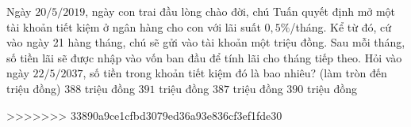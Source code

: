 \begin{ex}%
	Ngày $20/5/2019$, ngày con trai đầu lòng chào đời, chú Tuấn quyết định mở một tài khoản tiết kiệm ở ngân hàng cho con với lãi suất $0,5\%$/tháng. Kể từ đó, cứ vào ngày 21 hàng tháng, chú sẽ gửi vào tài khoản một triệu đồng. Sau mỗi tháng, số tiền lãi sẽ được nhập vào vốn ban đầu để tính lãi cho tháng tiếp theo. Hỏi vào ngày $22/5/2037$, số tiền trong khoản tiết kiệm đó là bao nhiêu? (làm tròn đến triệu đồng)
	\choice
	{$388$ triệu đồng}
	{$391$ triệu đồng}
	{$387$ triệu đồng}
	{\True $390$ triệu đồng}
\end{ex}

>>>>>>> 33890a9ce1cfbd3079ed36a93e836cf3ef1fde30
